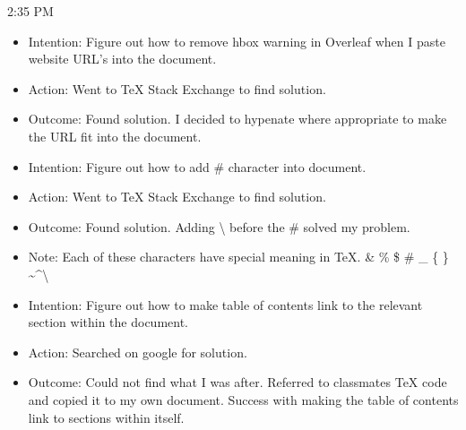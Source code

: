 \documentclass{article}
\begin{document}
2:35 PM

\begin{itemize}
    \item Intention: Figure out how to remove hbox warning in Overleaf when I paste website URL's into the document.
    \item Action: Went to TeX Stack Exchange to find solution.
    \item Outcome: Found solution. I decided to hypenate where appropriate to make the URL fit into the document.

    \item Intention: Figure out how to add \# character into document.
    \item Action: Went to TeX Stack Exchange to find solution.
    \item Outcome: Found solution. Adding {\textbackslash} before the \# solved my problem.
    \item Note: Each of these characters have special meaning in TeX. \& \% \$ \# \_ \{ \} \textasciitilde \textasciicircum \textbackslash
    \item Intention: Figure out how to make table of contents link to the relevant section within the document.
    \item Action: Searched on google for solution.
    \item Outcome: Could not find what I was after. Referred to classmates TeX code and copied it to my own document. Success with making the table of contents link to sections within itself.
\end{itemize}
\end{document}
